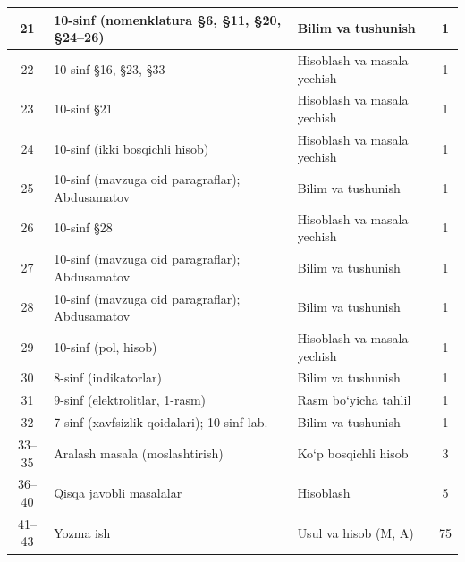 \documentclass[11pt,a4paper]{article}
\begin{document}
{\begin{longtable}{|c|p{7.2cm}|p{5.4cm}|c|}
21 & 10-sinf (nomenklatura \S{}6, \S{}11, \S{}20, \S{}24--26) & Bilim va tushunish & 1\\\hline
22 & 10-sinf \S{}16, \S{}23, \S{}33 & Hisoblash va masala yechish & 1\\\hline
23 & 10-sinf \S{}21 & Hisoblash va masala yechish & 1\\\hline
24 & 10-sinf (ikki bosqichli hisob) & Hisoblash va masala yechish & 1\\\hline
25 & 10-sinf (mavzuga oid paragraflar); Abdusamatov & Bilim va tushunish & 1\\\hline
26 & 10-sinf \S{}28 & Hisoblash va masala yechish & 1\\\hline
27 & 10-sinf (mavzuga oid paragraflar); Abdusamatov & Bilim va tushunish & 1\\\hline
28 & 10-sinf (mavzuga oid paragraflar); Abdusamatov & Bilim va tushunish & 1\\\hline
29 & 10-sinf (pol, hisob) & Hisoblash va masala yechish & 1\\\hline
30 & 8-sinf (indikatorlar) & Bilim va tushunish & 1\\\hline
31 & 9-sinf (elektrolitlar, 1-rasm) & Rasm bo`yicha tahlil & 1\\\hline
32 & 7-sinf (xavfsizlik qoidalari); 10-sinf lab. & Bilim va tushunish & 1\\\hline
33--35 & Aralash masala (moslashtirish) & Ko`p bosqichli hisob & 3\\\hline
36--40 & Qisqa javobli masalalar & Hisoblash & 5\\\hline
41--43 & Yozma ish & Usul va hisob (M, A) & 75\\\hline
\end{longtable}}
\end{document}
